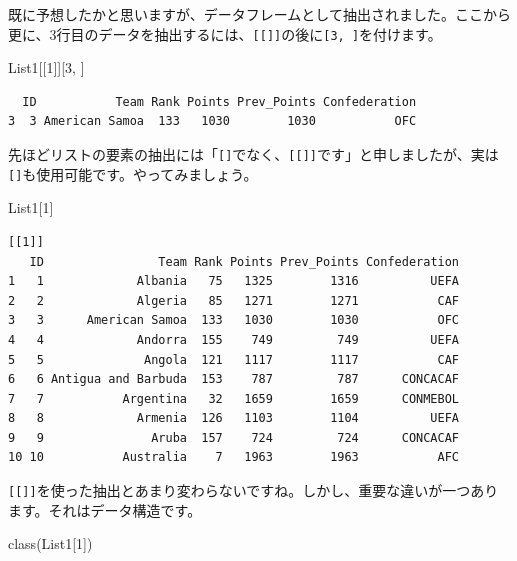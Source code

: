 \documentclass[
  a4paper,
  pandoc,
  ja=standard,
  jafont=haranoaji]{bxjsbook}
\newenvironment{Shaded}{\begin{snugshade}}{\end{snugshade}}
\newcommand{\DecValTok}[1]{\textcolor[rgb]{0.68,0.00,0.00}{#1}}
\newcommand{\FunctionTok}[1]{\textcolor[rgb]{0.28,0.35,0.67}{#1}}
\newcommand{\NormalTok}[1]{\textcolor[rgb]{0.00,0.48,0.65}{#1}}
\begin{document}
既に予想したかと思いますが、データフレームとして抽出されました。ここから更に、3行目のデータを抽出するには、\texttt{{[}{[}{]}{]}}の後に\texttt{{[}3,\ {]}}を付けます。

\begin{Shaded}
\begin{Highlighting}[numbers=left,,]
\NormalTok{List1[[}\DecValTok{1}\NormalTok{]][}\DecValTok{3}\NormalTok{, ]}
\end{Highlighting}
\end{Shaded}

\begin{verbatim}
  ID           Team Rank Points Prev_Points Confederation
3  3 American Samoa  133   1030        1030           OFC
\end{verbatim}

先ほどリストの要素の抽出には「\texttt{{[}{]}}でなく、\texttt{{[}{[}{]}{]}}です」と申しましたが、実は\texttt{{[}{]}}も使用可能です。やってみましょう。

\begin{Shaded}
\begin{Highlighting}[numbers=left,,]
\NormalTok{List1[}\DecValTok{1}\NormalTok{]}
\end{Highlighting}
\end{Shaded}

\begin{verbatim}
[[1]]
   ID                Team Rank Points Prev_Points Confederation
1   1             Albania   75   1325        1316          UEFA
2   2             Algeria   85   1271        1271           CAF
3   3      American Samoa  133   1030        1030           OFC
4   4             Andorra  155    749         749          UEFA
5   5              Angola  121   1117        1117           CAF
6   6 Antigua and Barbuda  153    787         787      CONCACAF
7   7           Argentina   32   1659        1659      CONMEBOL
8   8             Armenia  126   1103        1104          UEFA
9   9               Aruba  157    724         724      CONCACAF
10 10           Australia    7   1963        1963           AFC
\end{verbatim}

\texttt{{[}{[}{]}{]}}を使った抽出とあまり変わらないですね。しかし、重要な違いが一つあります。それはデータ構造です。

\begin{Shaded}
\begin{Highlighting}[numbers=left,,]
\FunctionTok{class}\NormalTok{(List1[}\DecValTok{1}\NormalTok{])}
\end{Highlighting}
\end{Shaded}
\end{document}
